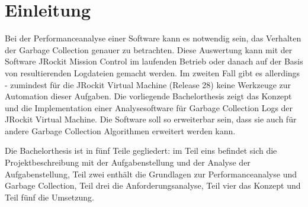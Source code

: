 \chapter*{Einleitung}
Bei der Performanceanalyse einer Software kann es notwendig sein, das  Verhalten der Garbage Collection genauer zu betrachten. Diese Auswertung kann mit der Software JRockit Mission Control im laufenden Betrieb oder danach auf der Basis von resultierenden Logdateien gemacht werden. Im zweiten Fall gibt es allerdings - zumindest für die JRockit Virtual Machine (Release 28) keine Werkzeuge zur Automation dieser Aufgaben. Die vorliegende Bachelorthesis zeigt das Konzept und die Implementation einer Analysesoftware für Garbage Collection Logs der JRockit Virtual Machine. Die Software soll so erweiterbar sein, dass sie auch für andere Garbage Collection Algorithmen erweitert werden kann.

Die Bachelorthesis ist in fünf Teile gegliedert: im Teil eins befindet sich die Projektbeschreibung mit der Aufgabenstellung und der Analyse der Aufgabenstellung, Teil zwei enthält die Grundlagen zur Performanceanalyse und Garbage Collection, Teil drei die Anforderungsanalyse, Teil vier das Konzept und Teil fünf die Umsetzung.